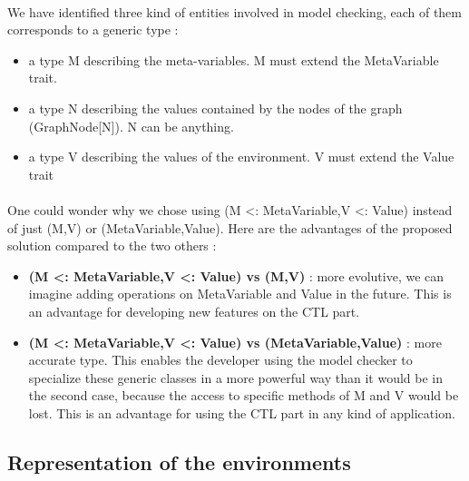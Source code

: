\documentclass{report}
\begin{document}
\paragraph{}
\hspace{4mm}We have identified three kind of entities involved in model checking, each of them corresponds to a generic type :

\vspace{1.5mm}
\begin{itemize}
\item a type M describing the meta-variables. M must extend the MetaVariable trait.\vspace{1mm}
\item a type N describing the values contained by the nodes of the graph (GraphNode[N]). N can be anything.\vspace{1mm}
\item a type V describing the values of the environment. V must extend the Value trait\vspace{1mm}
\end{itemize}

\paragraph{}
\hspace{4mm}One could wonder why we chose using (M <: MetaVariable,V <: Value) instead of 
just (M,V) or (MetaVariable,Value). Here are the advantages of the proposed solution compared to the two others :

\vspace{1.5mm}
\begin{itemize}
\item \textbf{(M <: MetaVariable,V <: Value) vs (M,V)} : more evolutive, we can imagine adding
operations on MetaVariable and Value in the future. This is an advantage for developing new features on the CTL part.\vspace{1mm}
\item \textbf{(M <: MetaVariable,V <: Value) vs (MetaVariable,Value)} : more accurate type. This enables the developer using the model checker to
specialize these generic classes in a more powerful way than it would be in the second case, because the access to specific methods of M and V would be lost.
This is an advantage for using the CTL part in any kind of application.\vspace{1mm}
\end{itemize}

\subsection{Representation of the environments}
\end{document}
